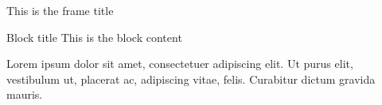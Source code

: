 \documentclass[t]{beamer}
\begin{document}

\begin{frame}{This is the frame title}
\begin{block}{Block title}
This is the block content
\end{block}
Lorem ipsum dolor sit amet, consectetuer adipiscing elit. Ut purus
elit, vestibulum ut, placerat ac, adipiscing vitae, felis. Curabitur
dictum gravida mauris. 
\end{frame}
\end{document}
